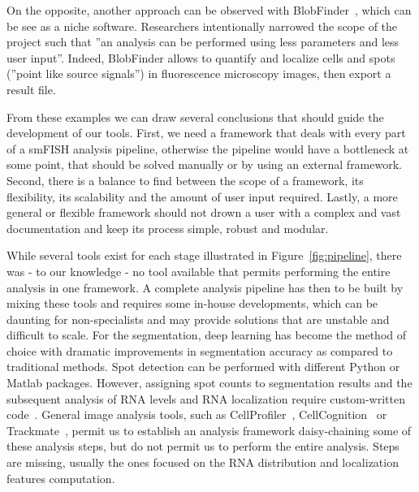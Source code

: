 On the opposite, another approach can be observed with BlobFinder~\cite{ALLALOU200958}, which can be see as a niche software.
Researchers intentionally narrowed the scope of the project such that ''an analysis can be performed using less parameters and less user input''.
Indeed, BlobFinder allows to quantify and localize cells and spots (''point like source signals'') in fluorescence microscopy images, then export a result file.

From these examples we can draw several conclusions that should guide the development of our tools.
First, we need a framework that deals with every part of a \ac{smFISH} analysis pipeline, otherwise the pipeline would have a bottleneck at some point, that should be solved manually or by using an external framework.
Second, there is a balance to find between the scope of a framework, its flexibility, its scalability and the amount of user input required.
Lastly, a more general or flexible framework should not drown a user with a complex and vast documentation and keep its process simple, robust and modular.

While several tools exist for each stage illustrated in Figure~\ref{fig:pipeline}, there was - to our knowledge - no tool available that permits performing the entire analysis in one framework.
A complete analysis pipeline has then to be built by mixing these tools and requires some in-house developments, which can be daunting for non-specialists and may provide solutions that are unstable and difficult to scale.
For the segmentation, deep learning has become the method of choice with dramatic improvements in segmentation accuracy as compared to traditional methods.
Spot detection can be performed with different Python or Matlab packages.
However, assigning spot counts to segmentation results and the subsequent analysis of \ac{RNA} levels and RNA localization require custom-written code~\cite{stoeger_computer_2015, samacoits_computational_2018}.
General image analysis tools, such as CellProfiler~\cite{mcquin_cellprofiler_2018}, CellCognition~\cite{held_cellcognition_2010} or Trackmate~\cite{ershov_bringing_2021}, permit us to establish an analysis framework daisy-chaining some of these analysis steps, but do not permit us to perform the entire analysis.
Steps are missing, usually the ones focused on the \ac{RNA} distribution and localization features computation.

